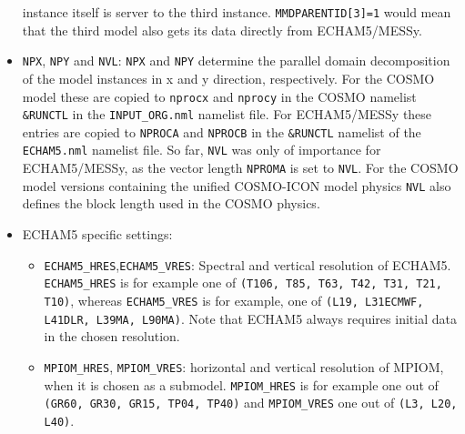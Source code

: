 \documentclass[11pt,twoside]{article}
\begin{document}
\begin{itemize}
 instance itself is server to the third
 instance. \verb|MMDPARENTID[3]=1| would mean that the 
third model also gets its data directly from ECHAM5/MESSy.
\item \verb|NPX|, \verb|NPY| and \verb|NVL|: \verb|NPX| and \verb|NPY| 
determine the parallel domain decomposition
of the model instances in x and y direction, respectively. For the
COSMO model these  
are copied to \verb|nprocx| and \verb|nprocy| in the COSMO namelist 
\verb|&RUNCTL| in the \verb|INPUT_ORG.nml| namelist file. 
For ECHAM5/MESSy
 these entries are copied to \verb|NPROCA| and \verb|NPROCB| in the
\verb|&RUNCTL| namelist of the \verb|ECHAM5.nml| namelist file.
So far, \verb|NVL| was only of importance for ECHAM5/MESSy, as the
vector length \verb|NPROMA| is set to \verb|NVL|. For the COSMO model
versions containing the unified COSMO-ICON model physics \verb|NVL|
also defines the block length used in the COSMO physics.
\item ECHAM5 specific settings:
\begin{itemize}
\item \verb|ECHAM5_HRES|,\verb|ECHAM5_VRES|: Spectral and vertical resolution
of ECHAM5. \verb|ECHAM5_HRES| is for example one of 
\verb|(T106, T85, T63, T42, T31, T21, T10)|, whereas \verb|ECHAM5_VRES|
is for example, one 
of \verb|(L19, L31ECMWF, L41DLR, L39MA, L90MA)|.
Note that ECHAM5 always requires initial data in the chosen resolution.
\item \verb|MPIOM_HRES|, \verb|MPIOM_VRES|: horizontal and vertical 
resolution of MPIOM, when it is chosen as a
submodel. \verb|MPIOM_HRES| is for example one out of 
\verb|(GR60, GR30, GR15, TP04, TP40)| and \verb|MPIOM_VRES| one out of 
\verb|(L3, L20, L40)|.


\end{itemize}
\end{itemize}
\end{document}
